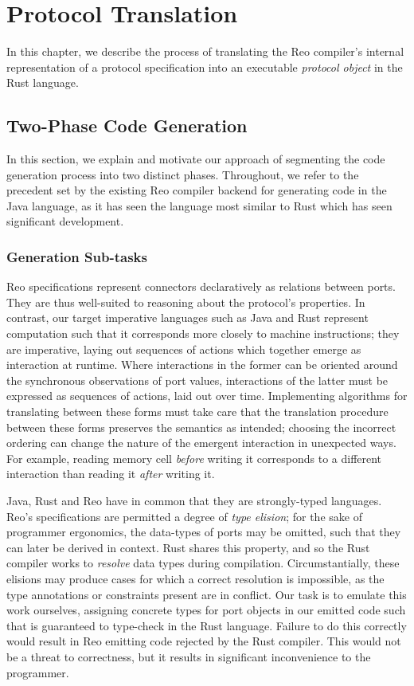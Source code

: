 \chapter{Protocol Translation}
\label{sec:imperative_form}
In this chapter, we describe the process of translating the Reo compiler's internal representation of a protocol specification into an executable \textit{protocol object} in the Rust language.

\section{Two-Phase Code Generation}
\label{sec:two_phase}
In this section, we explain and motivate our approach of segmenting the code generation process into two distinct phases. Throughout, we refer to the precedent set by the existing Reo compiler backend for generating code in the Java language, as it has seen the language most similar to Rust which has seen significant development.   

\subsection{Generation Sub-tasks}
\label{sec:sub_tasks}
Reo specifications represent connectors declaratively as relations between ports. They are thus well-suited to reasoning about the protocol's properties. In contrast, our target imperative languages such as Java and Rust represent computation such that it corresponds more closely to machine instructions; they are imperative, laying out sequences of actions which together emerge as interaction at runtime. Where interactions in the former can be oriented around the synchronous observations of port values, interactions of the latter must be expressed as sequences of actions, laid out over time. Implementing algorithms for translating between these forms must take care that the translation procedure between these forms preserves the semantics as intended; choosing the incorrect ordering can change the nature of the emergent interaction in unexpected ways. For example, reading memory cell \textit{before} writing it corresponds to a different interaction than reading it \textit{after} writing it. 

Java, Rust and Reo have in common that they are strongly-typed languages. Reo's specifications are permitted a degree of \textit{type elision}; for the sake of programmer ergonomics, the data-types of ports may be omitted, such that they can later be derived in context. Rust shares this property, and so the Rust compiler works to \textit{resolve} data types during compilation. Circumstantially, these elisions may produce cases for which a correct resolution is impossible, as the type annotations or constraints present are in conflict. Our task is to emulate this work ourselves, assigning concrete types for port objects in our emitted code such that is guaranteed to type-check in the Rust language. Failure to do this correctly would result in Reo emitting code rejected by the Rust compiler. This would not be a threat to correctness, but it results in significant inconvenience to the programmer.


